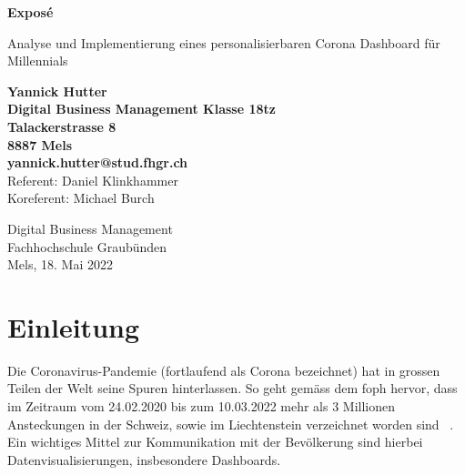\documentclass[12pt, oneside]{article}
\begin{document}
\begin{titlepage}
    \begin{center}
        \Huge
        \textbf{Exposé}

        \vspace{0.5cm}
        \LARGE
        Analyse und Implementierung eines personalisierbaren Corona Dashboard für Millennials

        \vspace{1.5cm}
        \normalsize
        \textbf{Yannick Hutter}\\
        \textbf{Digital Business Management Klasse 18tz}\\
        \textbf{Talackerstrasse 8}\\
        \textbf{8887 Mels}\\
        \textbf{yannick.hutter@stud.fhgr.ch}\\


        \vfill
        Referent: Daniel Klinkhammer\\
        Koreferent: Michael Burch\\

        \vspace{0.8cm}


        Digital Business Management\\
        Fachhochschule Graubünden\\
        Mels, 18. Mai 2022
    \end{center}
\end{titlepage}



\tableofcontents
\listoffigures
\listoftables

\clearpage
\printglossaries



\clearpage
{}
\setcounter{page}{3}

\section{Einleitung}
Die Coronavirus-Pandemie (fortlaufend als Corona bezeichnet) hat in grossen Teilen der Welt seine Spuren hinterlassen. So geht gemäss dem \Gls{foph} hervor, dass im Zeitraum vom 24.02.2020 bis zum 10.03.2022 mehr als 3 Millionen Ansteckungen in der Schweiz, sowie im Liechtenstein verzeichnet worden sind ~\citep{FOPH.13.03.2022}. Ein wichtiges Mittel zur Kommunikation mit der Bevölkerung sind hierbei Datenvisualisierungen, insbesondere Dashboards.\\
\end{document}
